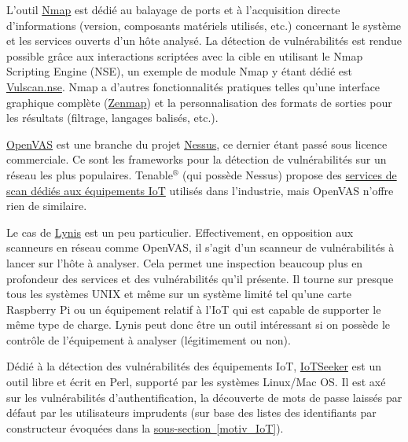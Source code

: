 \documentclass[]{article}
\newcommand{\wordlink}[2]{\hyperref[#1]{#2~\ref{#1}}}
\begin{document}
\par L'outil \href{https://nmap.org/}{Nmap} est dédié au balayage de ports et à l'acquisition directe d'informations (version, composants matériels utilisés, etc.) concernant le système et les services ouverts d'un hôte analysé. La détection de vulnérabilités est rendue possible grâce aux interactions scriptées avec la cible en utilisant le Nmap Scripting Engine (NSE), un exemple de module Nmap y étant dédié est \href{https://www.computec.ch/projekte/vulscan/}{Vulscan.nse}. Nmap a d'autres fonctionnalités pratiques telles qu'une interface graphique complète (\href{https://nmap.org/zenmap/}{Zenmap}) et la personnalisation des formats de sorties pour les résultats (filtrage, langages balisés, etc.).\\

\par \href{http://www.openvas.org/}{OpenVAS} est une branche du projet \href{https://www.tenable.com/products/nessus/nessus-professional}{Nessus}, ce dernier étant passé sous licence commerciale. Ce sont les frameworks pour la détection de vulnérabilités sur un réseau les plus populaires. Tenable$^{®}$ (qui possède Nessus) propose des \href{https://www.tenable.com/solutions/iot}{services de scan dédiés aux équipements IoT} utilisés dans l'industrie, mais OpenVAS n'offre rien de similaire.\\

\par Le cas de \href{https://cisofy.com/lynis/}{Lynis} est un peu particulier. Effectivement, en opposition aux scanneurs en réseau comme OpenVAS, il s'agit d'un scanneur de vulnérabilités à lancer sur l'hôte à analyser. Cela permet une inspection beaucoup plus en profondeur des services et des vulnérabilités qu'il présente. Il tourne sur presque tous les systèmes UNIX et même sur un système limité tel qu'une carte Raspberry Pi ou un équipement relatif à l'IoT qui est capable de supporter le même type de charge. Lynis peut donc être un outil intéressant si on possède le contrôle de l'équipement à analyser (légitimement ou non).\\

\par Dédié à la détection des vulnérabilités des équipements IoT, \href{https://github.com/rapid7/IoTSeeker}{IoTSeeker} est un outil libre et écrit en Perl, supporté par les systèmes Linux/Mac OS. Il est axé sur les vulnérabilités d'authentification, la découverte de mots de passe laissés par défaut par les utilisateurs imprudents (sur base des listes des identifiants par constructeur évoquées dans la \wordlink{motiv_IoT}{sous-section}).\\
\end{document}

